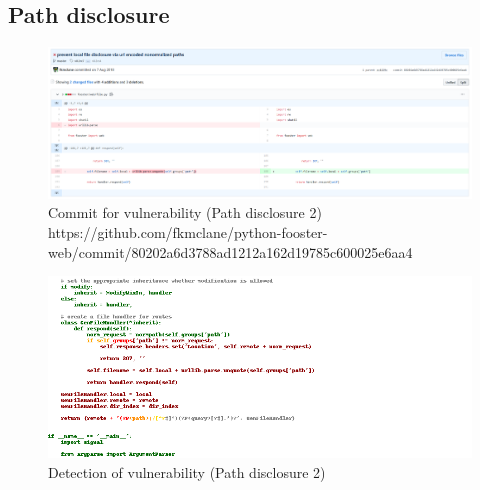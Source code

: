 \documentclass[
a4paper,
pagesize,
pdftex,
12pt,
twoside, %
BCOR=5mm, %
ngerman,
fleqn,
final,
]{scrartcl}
\begin{document}
	
	
	\subsection{Path disclosure}
	
	\begin{figure}[H]
		\centering
		\includegraphics[width=\linewidth]{Images/path_disclosureA}
		\caption{Commit for vulnerability (Path disclosure 2) \newline \scriptsize{https://github.com/fkmclane/python-fooster-web/commit/80202a6d3788ad1212a162d19785c600025e6aa4}}
		\label{fig:path_disclosureA}
	\end{figure}
	\begin{figure}[H]
		\centering
		\includegraphics[width=\linewidth]{Images/path_disclosureAr}
		\caption{Detection of vulnerability (Path disclosure 2)}
		\label{fig:path_disclosureAr}
	\end{figure}
	
	
	
	
	
\end{document}
